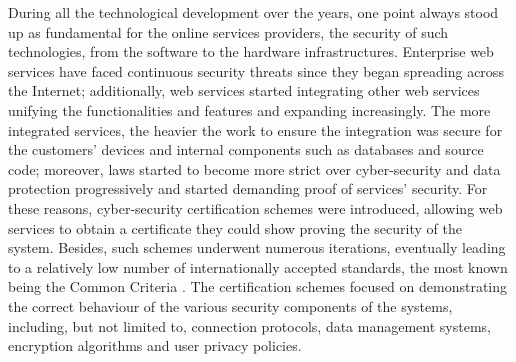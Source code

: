 During all the technological development over the years, one point always stood up as fundamental for the online services providers, the security of such technologies, from the software to the hardware infrastructures. Enterprise web services have faced continuous security threats since they began spreading across the Internet; additionally, web services started integrating other web services unifying the functionalities and features and expanding increasingly. The more integrated services, the heavier the work to ensure the integration was secure for the customers' devices and internal components such as databases and source code; moreover, laws started to become more strict over cyber-security and data protection progressively and started demanding proof of services' security. For these reasons, cyber-security certification schemes were introduced, allowing web services to obtain a certificate they could show proving the security of the system. Besides, such schemes underwent numerous iterations, eventually leading to a relatively low number of internationally accepted standards, the most known being the Common Criteria \cite{infrastructure2002common}. The certification schemes focused on demonstrating the correct behaviour of the various security components of the systems, including, but not limited to, connection protocols, data management systems, encryption algorithms and user privacy policies.
